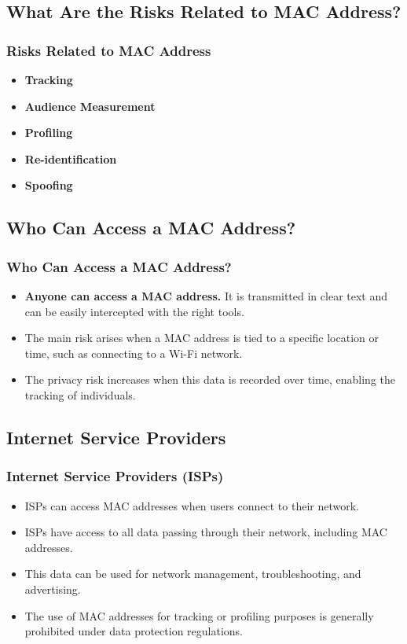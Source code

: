 \documentclass[
	11pt, %
]{beamer}
\begin{document}
\begin{frame}
  \section{What Are the Risks Related to MAC Address?}
  \frametitle{Risks Related to MAC Address}
  \begin{itemize}
    \item \textbf{Tracking} \pause
    \item \textbf{Audience Measurement} \pause
    \item \textbf{Profiling} \pause
    \item \textbf{Re-identification} \pause
    \item \textbf{Spoofing} 
  \end{itemize}
\end{frame}

\begin{frame}
  \section{Who Can Access a MAC Address?}
  \frametitle{Who Can Access a MAC Address?}
  \begin{itemize}
    \item \textbf{Anyone can access a MAC address.} It is transmitted in clear text and can be easily intercepted with the right tools. \pause
    \item The main risk arises when a MAC address is tied to a specific location or time, such as connecting to a Wi-Fi network. \pause
    \item The privacy risk increases when this data is recorded over time, enabling the tracking of individuals. 
  \end{itemize}
\end{frame}

\begin{frame}
  \section{Internet Service Providers}
  \frametitle{Internet Service Providers (ISPs)}
  \begin{itemize}
    \item ISPs can access MAC addresses when users connect to their network. \pause
    \item ISPs have access to all data passing through their network, including MAC addresses. \pause
    \item This data can be used for network management, troubleshooting, and advertising. \pause
    \item The use of MAC addresses for tracking or profiling purposes is generally prohibited under data protection regulations. 
  \end{itemize}
\end{frame}
\end{document}
